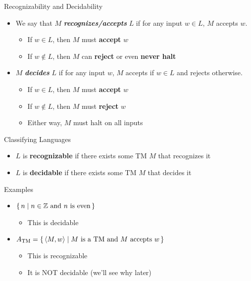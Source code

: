 \documentclass[aspectratio=169]{beamer}
\begin{document}
\begin{frame}{Recognizability and Decidability}
    \begin{itemize}
        \item We say that $M$ \textbf{\textit{recognizes/accepts}} $L$ if for any input $w\in L$, $M$ accepts $w$. \pause
        \begin{itemize}
            \item If $w \in L$, then $M$ must \textbf{accept} $w$
            \item If $w \notin L$, then $M$ can \textbf{reject} or even \textbf{never halt} \pause
        \end{itemize}
        \item $M$ \textbf{\textit{decides}} $L$ if for any input $w$, $M$ accepts if $w \in L$ and rejects otherwise.
        \begin{itemize}
            \item If $w \in L$, then $M$ must \textbf{accept} $w$
            \item If $w \notin L$, then $M$ must \textbf{reject} $w$ \pause
            \item Either way, $M$ must halt on all inputs
        \end{itemize}
    \end{itemize}
\end{frame}

\begin{frame}{Classifying Languages}
    \begin{itemize}
        \item $L$ is \textbf{recognizable} if there exists some TM $M$ that recognizes it \pause
        \item $L$ is \textbf{decidable} if there exists some TM $M$ that decides it
    \end{itemize}
\end{frame}

\begin{frame}{Examples}
    \begin{itemize}
        \item $\set{n | n \in \mathbb{Z} \text{ and $n$ is even}}$ 
        \begin{itemize}
            \item This is decidable
        \end{itemize} \pause
        \item $A_{\text{TM}} = \set{\langle M, w \rangle | \text{$M$ is a TM and $M$ accepts $w$}}$
        \begin{itemize}
            \item This is recognizable \pause
            \item It is NOT decidable (we'll see why later)
        \end{itemize}
    \end{itemize}
\end{frame}
\end{document}
